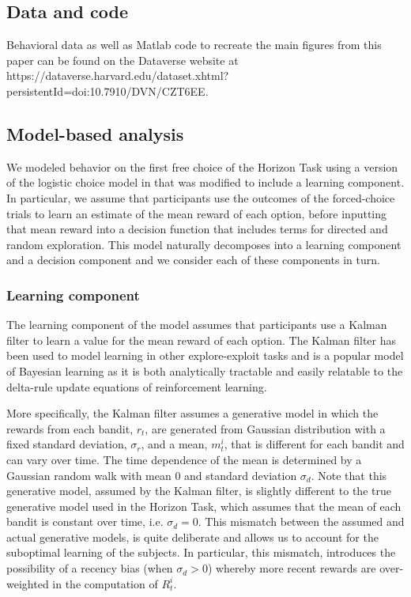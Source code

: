 \documentclass[12pt]{article}
\begin{document}
\subsection*{Data and code}
Behavioral data as well as Matlab code to recreate the main figures from this paper can be found on the Dataverse website at https://dataverse.harvard.edu/dataset.xhtml?persistentId=doi:10.7910/DVN/CZT6EE.


\subsection*{Model-based analysis}
We modeled behavior on the first free choice of the Horizon Task using a version of the logistic choice model in \cite{Wilson2014-ob} that was modified to include a learning component. In particular, we assume that participants use the outcomes of the forced-choice trials to learn an estimate of the mean reward of each option, before inputting that mean reward into a decision function that includes terms for directed and random exploration.  This model naturally decomposes into a learning component and a decision component and we consider each of these components in turn.

\subsubsection*{Learning component}
The learning component of the model assumes that participants use a Kalman filter to learn a value for the mean reward of each option. The Kalman filter \cite{Kalman1960-uo} has been used to model learning in other explore-exploit tasks \cite{Daw2006-vw} and is a popular model of Bayesian learning as it is both analytically tractable and easily relatable to the delta-rule update equations of reinforcement learning.

More specifically, the Kalman filter assumes a generative model in which the rewards from each bandit, $r_t$, are generated from Gaussian distribution with a fixed standard deviation, $\sigma_r$, and a mean, $m^i_t$, that is different for each bandit and can vary over time. The time dependence of the mean is determined by a Gaussian random walk with mean 0 and standard deviation $\sigma_d$. Note that this generative model, assumed by the Kalman filter, is slightly different to the true generative model used in the Horizon Task, which assumes that the mean of each bandit is constant over time, i.e. $\sigma_d = 0.$  This mismatch between the assumed and actual generative models, is quite deliberate and allows us to account for the suboptimal learning of the subjects. In particular, this mismatch, introduces the possibility of a recency bias (when $\sigma_d > 0$) whereby more recent rewards are over-weighted in the computation of $R^i_t$.
\end{document}
